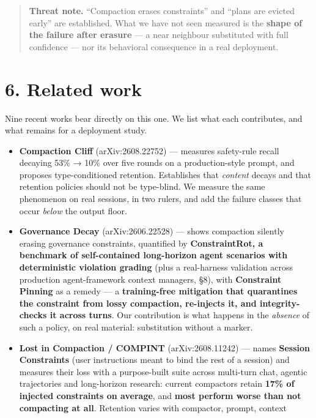 \documentclass[
]{article}
\providecommand{\tightlist}{%
  \setlength{\itemsep}{0pt}\setlength{\parskip}{0pt}}
\begin{document}
\begin{quote}
\textbf{Threat note.} ``Compaction erases constraints'' and ``plans are
evicted early'' are established. What we have not seen measured is the
\textbf{shape of the failure after erasure} --- a near neighbour
substituted with full confidence --- nor its behavioral consequence in a
real deployment.
\end{quote}

\section{6. Related work}\label{related-work}

Nine recent works bear directly on this one. We list what each
contributes, and what remains for a deployment study.

\begin{itemize}
\tightlist
\item
  \textbf{Compaction Cliff} (arXiv:2608.22752) --- measures safety-rule
  recall decaying 53\% → 10\% over five rounds on a production-style
  prompt, and proposes type-conditioned retention. Establishes that
  \emph{content} decays and that retention policies should not be
  type-blind. We measure the same phenomenon on real sessions, in two
  rulers, and add the failure classes that occur \emph{below} the output
  floor.
\item
  \textbf{Governance Decay} (arXiv:2606.22528) --- shows compaction
  silently erasing governance constraints, quantified by
  \textbf{ConstraintRot, a benchmark of self-contained long-horizon
  agent scenarios with deterministic violation grading} (plus a
  real-harness validation across production agent-framework context
  managers, §8), with \textbf{Constraint Pinning} as a remedy --- a
  \textbf{training-free mitigation that quarantines the constraint from
  lossy compaction, re-injects it, and integrity-checks it across
  turns}. Our contribution is what happens in the \emph{absence} of such
  a policy, on real material: substitution without a marker.
\item
  \textbf{Lost in Compaction / COMPINT} (arXiv:2608.11242) --- names
  \textbf{Session Constraints} (user instructions meant to bind the rest
  of a session) and measures their loss with a purpose-built suite
  across multi-turn chat, agentic trajectories and long-horizon
  research: current compactors retain \textbf{17\% of injected
  constraints on average}, and \textbf{most perform worse than not
  compacting at all}. Retention varies with compactor, prompt, context

\end{itemize}
\end{document}
